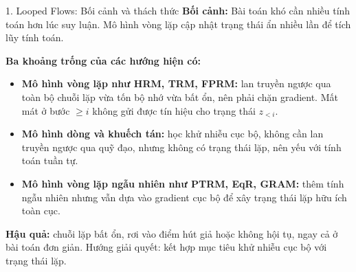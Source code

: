\begin{frame}{1. Looped Flows: Bối cảnh và thách thức}
    \textbf{Bối cảnh:} Bài toán khó cần nhiều tính toán hơn lúc suy luận. Mô hình vòng lặp cập nhật trạng thái ẩn nhiều lần để tích lũy tính toán.
    \vspace{0.1cm}

    \textbf{Ba khoảng trống của các hướng hiện có:}
    \begin{itemize}
        \item \textbf{Mô hình vòng lặp như HRM, TRM, FPRM:} lan truyền ngược qua toàn bộ chuỗi lặp vừa tốn bộ nhớ vừa bất ổn, nên phải chặn gradient. Mất mát ở bước $\ge i$ không gửi được tín hiệu cho trạng thái $z_{<i}$.
        \item \textbf{Mô hình dòng và khuếch tán:} học khử nhiễu cục bộ, không cần lan truyền ngược qua quỹ đạo, nhưng không có trạng thái lặp, nên yếu với tính toán tuần tự.
        \item \textbf{Mô hình vòng lặp ngẫu nhiên như PTRM, EqR, GRAM:} thêm tính ngẫu nhiên nhưng vẫn dựa vào gradient cục bộ để xây trạng thái lặp hữu ích toàn cục.
    \end{itemize}
    \vspace{0.1cm}
    \textbf{Hậu quả:} chuỗi lặp bất ổn, rơi vào điểm hút giả hoặc không hội tụ, ngay cả ở bài toán đơn giản. Hướng giải quyết: kết hợp mục tiêu khử nhiễu cục bộ với trạng thái lặp.
\end{frame}

